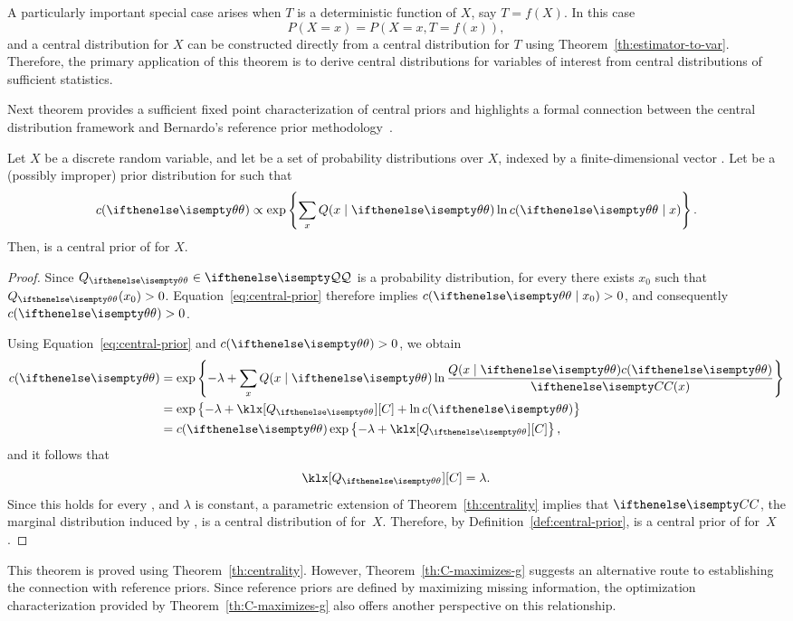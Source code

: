 A particularly important special case arises when $T$ is a deterministic function of $X$, say $T=f(X)$.
In this case
\[
    P(X = x) = P(X = x, T = f(x)),
\]
and a central distribution for $X$ can be constructed directly from a central distribution for $T$ using
Theorem~\ref{th:estimator-to-var}.
Therefore, the primary application of this theorem is to derive central distributions for variables of interest from
central distributions of sufficient statistics.

Next theorem provides a sufficient fixed point characterization of central priors
and highlights a formal connection between the central distribution framework and Bernardo's reference
prior methodology~\cite{BERNARDO200517}.

\begin{theorem} \label{th:fixed-point}
    Let $X$ be a discrete random variable, and let \setQ be a set of probability distributions over $X$, indexed by a
    finite-dimensional vector \param.
    Let \cPrior be a (possibly improper) prior distribution for \param such that
    \begin{equation}
        \label{eq:central-prior}
        \cPrior(\paramVal) \propto \exp \left\{  \sum_{x} \like(\xIt) \ln \cPrior(\tIx) \right\}.
    \end{equation}
    Then, \cPrior is a central prior of \setQ for $X$.
\end{theorem}

\begin{proof}
    \newcommand{\cp}{\cPrior(\paramVal{})}
    Since $Q_{\paramVal} \in \setQ$ is a probability distribution,
    for every \paramVal there exists $x_0$ such that $Q_{\paramVal}(x_0) > 0$.
    Equation~\ref{eq:central-prior} therefore implies $\cPrior(\tIx_0) > 0$,
    and consequently $\cp > 0$.

    Using Equation~\ref{eq:central-prior} and $\cp > 0$, we obtain
    \begin{align*}
        \cp
        &= \exp \left\{-\lambda +  \sum_{x} \like(\xIt) \ln \frac{\like(\xIt) \cp}{\cDist(x)} \right\} \\
        &= \exp \left\{-\lambda +  \klx[Q_{\paramVal{}}][C] + \ln \cp \right\} \\
        &= \cp \exp \left\{-\lambda +  \klx[Q_{\paramVal{}}][C] \right\},
    \end{align*}
    and it follows that
    \[
        \klx[Q_{\paramVal{}}][C] = \lambda.
    \]
    Since this holds for every \paramVal, and $\lambda$ is constant,
    a parametric extension of Theorem~\ref{th:centrality} implies that $\cDist$,
    the marginal distribution induced by \cPrior, is a central distribution of \setQ for~$X$.
    Therefore, by Definition~\ref{def:central-prior}, \cPrior is a central prior of \setQ for~$X$.
\end{proof}

This theorem is proved using Theorem~\ref{th:centrality}.
However, Theorem~\ref{th:C-maximizes-g} suggests an alternative route to establishing the connection with reference
priors.
Since reference priors are defined by maximizing missing information,
the optimization characterization provided by Theorem~\ref{th:C-maximizes-g} also offers another perspective on
this relationship.
